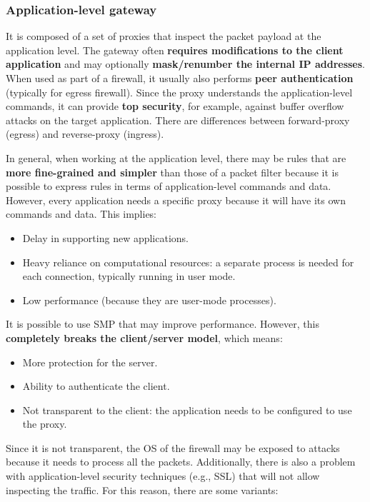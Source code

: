 \subsubsection{Application-level gateway}
It is composed of a set of proxies that inspect the packet payload at the application level. The gateway often \textbf{requires modifications to the client application} and may optionally \textbf{mask/renumber the internal IP addresses}. When used as part of a firewall, it usually also performs \textbf{peer authentication} (typically for egress firewall). Since the proxy understands the application-level commands, it can provide \textbf{top security}, for example, against buffer overflow attacks on the target application. There are differences between forward-proxy (egress) and reverse-proxy (ingress).

In general, when working at the application level, there may be rules that are \textbf{more fine-grained and simpler} than those of a packet filter because it is possible to express rules in terms of application-level commands and data. However, every application needs a specific proxy because it will have its own commands and data. This implies:

\begin{itemize}
	\item Delay in supporting new applications.
	\item Heavy reliance on computational resources: a separate process is needed for each connection, typically running in user mode.
	\item Low performance (because they are user-mode processes).
\end{itemize}

It is possible to use SMP that may improve performance. However, this \textbf{completely breaks the client/server model}, which means:

\begin{itemize}
	\item More protection for the server.
	\item Ability to authenticate the client.
	\item Not transparent to the client: the application needs to be configured to use the proxy.
\end{itemize}

Since it is not transparent, the OS of the firewall may be exposed to attacks because it needs to process all the packets. Additionally, there is also a problem with application-level security techniques (e.g., SSL) that will not allow inspecting the traffic. For this reason, there are some variants:

